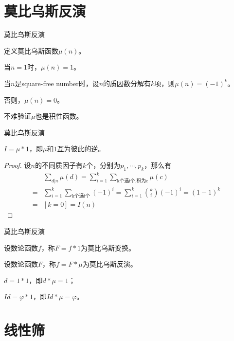 \documentclass{ctexbeamer}        %
\begin{document}
\section{莫比乌斯反演}
\begin{frame}{莫比乌斯反演}
\begin{definition}[莫比乌斯函数]
    定义莫比乌斯函数$\mu(n)$。
    
    当$n=1$时，$\mu(n)=1$。

    当$n$是square-free number时，设$n$的质因数分解有$k$项，则$\mu(n)=(-1)^k$。

    否则，$\mu(n)=0$。
\end{definition}
不难验证$\mu$也是积性函数。
\end{frame}

\begin{frame}{莫比乌斯反演}
\begin{theorem}
    $I = \mu \ast 1$，即$\mu$和$1$互为彼此的逆。
\end{theorem}
\begin{proof}
    设$n$的不同质因子有$k$个，分别为$p_1,\cdots,p_k$，那么有
    \begin{align*}
        &\sum_{d|n}\mu(d)=\sum_{i=1}^k \sum_{\text{k个选i个,积为c}} \mu(c)\\
        =&\sum_{i=1}^k \sum_{\text{k个选i个}} (-1)^i=\sum_{i=1}^k \binom{k}{i} (-1)^i=(1-1)^k\\
        =&[k=0]=I(n)
    \end{align*}
\end{proof}
\end{frame}

\begin{frame}{莫比乌斯反演}
\begin{definition}[莫比乌斯变换]
    设数论函数$f$，称$F=f \ast 1$为莫比乌斯变换。
\end{definition}
\begin{definition}[莫比乌斯反演]
    设数论函数$F$，称$f=F \ast \mu$为莫比乌斯反演。
\end{definition}
\begin{example}
    $d=1 \ast 1$，即$d \ast \mu = 1$；

    $Id=\varphi \ast 1$，即$Id \ast \mu = \varphi$。
\end{example}
\end{frame}

\section{线性筛}
\end{document}
